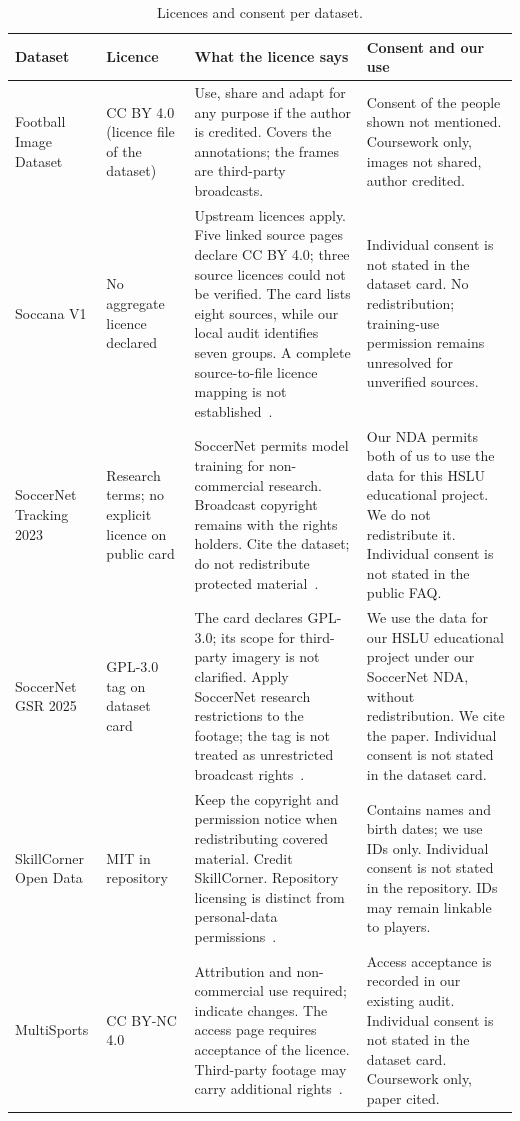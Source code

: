 \documentclass[11pt, a4paper]{article}
\begin{document}
\begin{table}[ht]
\centering\scriptsize
\begin{tabularx}{\textwidth}{@{}>{\raggedright\arraybackslash}p{2.0cm} >{\raggedright\arraybackslash}p{2.2cm} L >{\raggedright\arraybackslash}p{3.6cm}@{}}
\toprule
\textbf{Dataset} & \textbf{Licence} & \textbf{What the licence says} & \textbf{Consent and our use} \\
\midrule
Football Image Dataset & CC BY 4.0 (licence file of the dataset) & Use, share and adapt for any purpose if the author is credited. Covers the annotations; the frames are third-party broadcasts. & Consent of the people shown not mentioned. Coursework only, images not shared, author credited. \\
Soccana V1 & No aggregate licence declared & Upstream licences apply. Five linked source pages declare CC BY 4.0; three source licences could not be verified. The card lists eight sources, while our local audit identifies seven groups. A complete source-to-file licence mapping is not established~\cite{soccana,rfAS,rfRF,rfSAC,rfVA,rfVAA}. & Individual consent is not stated in the dataset card. No redistribution; training-use permission remains unresolved for unverified sources. \\
SoccerNet Tracking 2023 & Research terms; no explicit licence on public card & SoccerNet permits model training for non-commercial research. Broadcast copyright remains with the rights holders. Cite the dataset; do not redistribute protected material~\cite{sndata,snfaq,trackingcard}. & Our NDA permits both of us to use the data for this HSLU educational project. We do not redistribute it. Individual consent is not stated in the public FAQ. \\
SoccerNet GSR 2025 & GPL-3.0 tag on dataset card & The card declares GPL-3.0; its scope for third-party imagery is not clarified. Apply SoccerNet research restrictions to the footage; the tag is not treated as unrestricted broadcast rights~\cite{snfaq,gsrCard}. & We use the data for our HSLU educational project under our SoccerNet NDA, without redistribution. We cite the paper. Individual consent is not stated in the dataset card. \\
SkillCorner Open Data & MIT in repository & Keep the copyright and permission notice when redistributing covered material. Credit SkillCorner. Repository licensing is distinct from personal-data permissions~\cite{skillcorner}. & Contains names and birth dates; we use IDs only. Individual consent is not stated in the repository. IDs may remain linkable to players. \\
MultiSports & CC BY-NC 4.0 & Attribution and non-commercial use required; indicate changes. The access page requires acceptance of the licence. Third-party footage may carry additional rights~\cite{multisportscard}. & Access acceptance is recorded in our existing audit. Individual consent is not stated in the dataset card. Coursework only, paper cited. \\
\bottomrule
\end{tabularx}
\caption{Licences and consent per dataset.}
\label{tab:licence}
\end{table}
\end{document}
